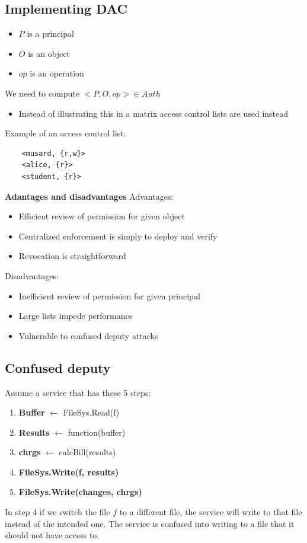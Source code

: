 \documentclass[12pt,a4paper]{article}
\begin{document}
\subsection{Implementing DAC}
\begin{itemize}
    \item $P$ is a principal
    \item $O$ is an object
    \item $op$ is an operation
\end{itemize}

We need to compute $<P, O, op> \in Auth$ 
\begin{itemize}
    \item Instead of illustrating this in a matrix access control lists are used instead
\end{itemize}

Example of an access control list:
\begin{verbatim}
    <musard, {r,w}>
    <alice, {r}>
    <student, {r}>
\end{verbatim}

\noindent \textbf{Adantages and disadvantages}
Advantages:
\begin{itemize}
    \item Efficient review of permission for given object
    \item Centralized enforcement is simply to deploy and verify 
    \item Revocation is straightforward
\end{itemize}
Disadvantages:
\begin{itemize}
    \item Inefficient review of permission for given principal
    \item Large lists impede performance
    \item Vulnerable to confused deputy attacks
\end{itemize}

\subsection{Confused deputy}
Assume a service that has these 5 steps:
\begin{enumerate}
    \item \textbf{Buffer} $\leftarrow$ FileSys.Read(f)
    \item \textbf{Results} $\leftarrow$ function(buffer)
    \item \textbf{chrgs} $\leftarrow$ calcBill(results)
    \item \textbf{FileSys.Write(f, results)}
    \item \textbf{FileSys.Write(changes, chrgs)}
\end{enumerate}
In step 4 if we switch the file $f$ to a different file, the service will write to that file instead of the intended one. The service is confused into writing to a file that it should not have access to.
\end{document}

